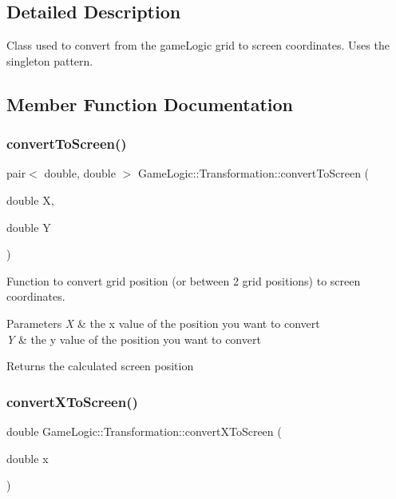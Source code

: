 \subsection{Detailed Description}
Class used to convert from the game\+Logic grid to screen coordinates. Uses the singleton pattern. 

\subsection{Member Function Documentation}
\mbox{\label{classGameLogic_1_1Transformation_a30bed07a78fb248b129e50234ecef28a}} 
\subsubsection{\texorpdfstring{convert\+To\+Screen()}{convertToScreen()}}
{\footnotesize\ttfamily pair$<$ double, double $>$ Game\+Logic\+::\+Transformation\+::convert\+To\+Screen (\begin{DoxyParamCaption}\item[{double}]{X,  }\item[{double}]{Y }\end{DoxyParamCaption})}

Function to convert grid position (or between 2 grid positions) to screen coordinates. 
\begin{DoxyParams}{Parameters}
{\em X} & the x value of the position you want to convert \\
\hline
{\em Y} & the y value of the position you want to convert \\
\hline
\end{DoxyParams}
\begin{DoxyReturn}{Returns}
the calculated screen position 
\end{DoxyReturn}
\mbox{\label{classGameLogic_1_1Transformation_a1168354a2f68dcfcee917da9ec1076ac}} 
\subsubsection{\texorpdfstring{convert\+X\+To\+Screen()}{convertXToScreen()}}
{\footnotesize\ttfamily double Game\+Logic\+::\+Transformation\+::convert\+X\+To\+Screen (\begin{DoxyParamCaption}\item[{double}]{x }\end{DoxyParamCaption})}

